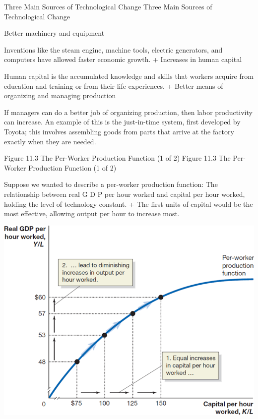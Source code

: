 \documentclass[
  12pt,
  ignorenonframetext,
]{beamer}
\begin{document}
\begin{frame}{Three Main Sources of Technological Change}
\protect\hypertarget{three-main-sources-of-technological-change}{}
Three Main Sources of Technological Change

Better machinery and equipment

Inventions like the steam engine, machine tools, electric generators,
and computers have allowed faster economic growth. + Increases in human
capital

Human capital is the accumulated knowledge and skills that workers
acquire from education and training or from their life experiences. +
Better means of organizing and managing production

If managers can do a better job of organizing production, then labor
productivity can increase. An example of this is the just-in-time
system, first developed by Toyota; this involves assembling goods from
parts that arrive at the factory exactly when they are needed.
\end{frame}

\begin{frame}{Figure 11.3 The Per-Worker Production Function (1 of 2)}
\protect\hypertarget{figure-11.3-the-per-worker-production-function-1-of-2}{}
Figure 11.3 The Per-Worker Production Function (1 of 2)

Suppose we wanted to describe a per-worker production function: The
relationship between real G D P per hour worked and capital per hour
worked, holding the level of technology constant. + The first units of
capital would be the most effective, allowing output per hour to
increase most.

\includegraphics[width=\textwidth,height=0.99\textheight]{imgs3/img_slide18a.png}
\end{frame}
\end{document}
